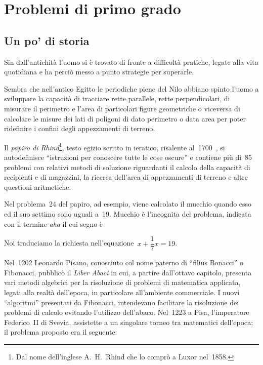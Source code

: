 
\chapter{Problemi di primo grado}\label{cap:equazioni_I_grado}

\section{Un po' di storia}

Sin dall'antichità l'uomo si è
trovato di fronte a difficoltà pratiche, legate alla vita quotidiana
e ha perciò messo a punto strategie per superarle.

Sembra che nell'antico Egitto le periodiche piene del
Nilo abbiano spinto l'uomo a sviluppare la capacità
di tracciare rette parallele, rette perpendicolari, di misurare il
perimetro e l'area di particolari figure geometriche o
viceversa di calcolare le misure dei lati di poligoni di dato perimetro
o data area per poter ridefinire i confini degli appezzamenti di
terreno.

Il \emph{papiro di Rhind}\footnote{Dal nome dell'inglese A.~H.~Rhind che lo comprò a Luxor nel~1858.}, testo egizio scritto in
ieratico, risalente al~1700~\aC, si autodefinisce
``istruzioni per conoscere tutte le cose
oscure'' e contiene più di~85 problemi con relativi
metodi di soluzione riguardanti il calcolo della capacità di
recipienti e di magazzini, la ricerca dell'area di
appezzamenti di terreno e altre questioni aritmetiche.

Nel problema~24 del papiro, ad esempio, viene calcolato il mucchio
quando esso ed il suo settimo sono uguali a~19. Mucchio è
l'incognita del problema, indicata con il termine
\emph{aha} il cui segno è


Noi traduciamo la richiesta nell'equazione~$x+\dfrac{1}{7}x=19$.

Nel~1202 Leonardo Pisano, conosciuto col nome paterno di
``filius Bonacci'' o Fibonacci, pubblicò il
\emph{Liber Abaci} in cui, a partire dall'ottavo
capitolo, presenta vari metodi algebrici per la risoluzione di problemi
di matematica applicata, legati alla realtà
dell'epoca, in particolare
all'ambiente commerciale. I nuovi
``algoritmi'' presentati da Fibonacci,
intendevano facilitare la risoluzione dei problemi di calcolo evitando
l'utilizzo dell'abaco. Nel~1223 a
Pisa, l'imperatore Federico~II di Svevia, assistette a
un singolare torneo tra matematici dell'epoca; il
problema proposto era il seguente:

